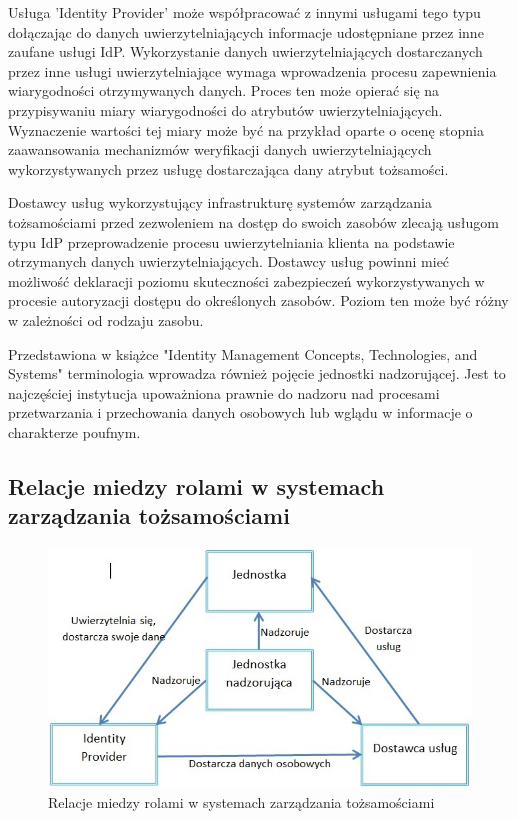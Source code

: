 Usługa 'Identity Provider' może współpracować z innymi usługami tego typu dołączając do danych uwierzytelniających informacje udostępniane przez inne zaufane usługi IdP. Wykorzystanie danych uwierzytelniających dostarczanych przez inne usługi uwierzytelniające wymaga wprowadzenia procesu zapewnienia wiarygodności otrzymywanych danych. Proces ten może opierać się na przypisywaniu miary wiarygodności do atrybutów uwierzytelniających. Wyznaczenie wartości tej miary może być na przykład oparte o ocenę stopnia zaawansowania mechanizmów weryfikacji danych uwierzytelniających wykorzystywanych przez usługę dostarczająca dany atrybut tożsamości.

Dostawcy usług wykorzystujący infrastrukturę systemów zarządzania tożsamościami przed zezwoleniem na dostęp do swoich zasobów zlecają usługom typu IdP przeprowadzenie procesu uwierzytelniania klienta na podstawie otrzymanych danych uwierzytelniających. Dostawcy usług powinni mieć możliwość deklaracji poziomu skuteczności zabezpieczeń wykorzystywanych w procesie autoryzacji dostępu do określonych zasobów. Poziom ten może być różny w zależności od rodzaju zasobu.

Przedstawiona w książce "Identity Management Concepts, Technologies, and Systems" terminologia wprowadza również pojęcie jednostki nadzorującej\cite{Bertino11}. Jest to najczęściej instytucja upoważniona prawnie do nadzoru nad procesami przetwarzania i przechowania danych osobowych lub wglądu  w informacje o charakterze poufnym.

\subsection{Relacje miedzy rolami w systemach zarządzania tożsamościami}

	\begin{figure}[h]
		\centering
		\includegraphics[width=15cm]{img/idmRelations.jpg}
		\caption{Relacje miedzy rolami w systemach zarządzania tożsamościami}
		\label{Relacje miedzy rolami w systemach zarządzania tożsamościami}
	\end{figure}

